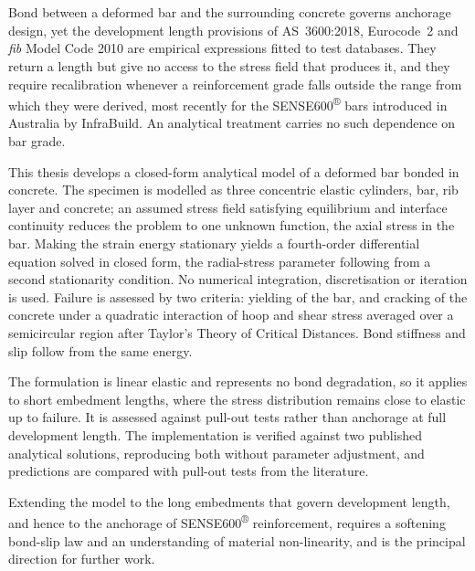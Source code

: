 \chapter*{}

Bond between a deformed bar and the surrounding concrete governs anchorage
design, yet the development length provisions of AS~3600:2018, Eurocode~2 and
\textit{fib} Model Code 2010 are empirical expressions fitted to test
databases. They return a length but give no access to the stress field that
produces it, and they require recalibration whenever a reinforcement grade
falls outside the range from which they were derived, most recently for the
SENSE600\textsuperscript{®} bars introduced in Australia by InfraBuild. An
analytical treatment carries no such dependence on bar grade.

This thesis develops a closed-form analytical model of a deformed bar bonded
in concrete. The specimen is modelled as three concentric elastic cylinders,
bar, rib layer and concrete; an assumed stress field satisfying equilibrium
and interface continuity reduces the problem to one unknown function, the
axial stress in the bar. Making the strain energy stationary yields a
fourth-order differential equation solved in closed form, the radial-stress
parameter following from a second stationarity condition. No numerical
integration, discretisation or iteration is used. Failure is assessed by two
criteria: yielding of the bar, and cracking of the concrete under a quadratic
interaction of hoop and shear stress averaged over a semicircular region after
Taylor's Theory of Critical Distances. Bond stiffness and slip follow from the
same energy.

The formulation is linear elastic and represents no bond degradation, so it
applies to short embedment lengths, where the stress distribution remains
close to elastic up to failure. It is assessed against pull-out tests rather
than anchorage at full development length. The implementation is verified
against two published analytical solutions, reproducing both without parameter
adjustment, and predictions are compared with pull-out tests from the
literature.

Extending the model to the long embedments that govern development length, and
hence to the anchorage of SENSE600\textsuperscript{®} reinforcement, requires a
softening bond-slip law and an understanding of material non-linearity, and is the principal
direction for further work.